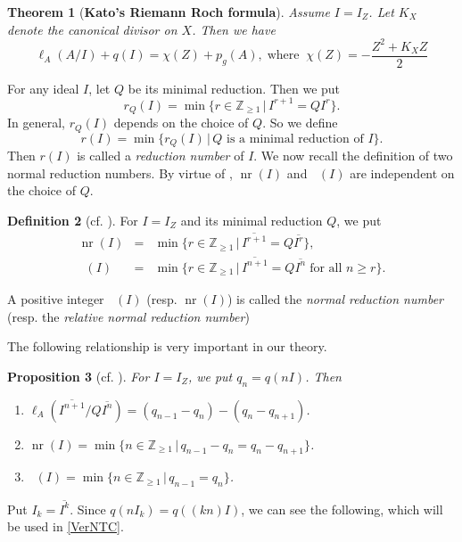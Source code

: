 \documentclass[12pt]{amsart}
\newtheorem{thm}{Theorem}[section]
\newtheorem{prop}[thm]{Proposition}
\theoremstyle{definition}
\newtheorem{defn}[thm]{Definition}
\theoremstyle{remark}
\numberwithin{equation}{section}
\DeclareMathOperator{\nr}{nr}
\DeclareMathOperator{\br}{\bar r}
\newcommand{\Z}{\mathbb Z}
\newcommand{\bbZ}{\ensuremath{\mathbb Z}}
\renewcommand{\:}{\colon}
\begin{document}
\begin{thm}[\textbf{Kato's Riemann Roch formula}] \label{RRformula}
Assume $I=I_Z$. Let $K_X$ denote the canonical divisor on $X$. 
Then we have 
\[
\ell_A(A/I)+q(I)=\chi(Z)+p_g(A), \;\text{where}\;\; \chi(Z)=-\dfrac{Z^2+K_XZ}{2}
\]
\end{thm}


\par \vspace{2mm}
For any ideal $I$, let $Q$ be its minimal reduction. 
Then we put 
\[
r_Q(I)=\min\{r \in \Z_{\ge 1}\,|\, I^{r+1}=QI^r\}. 
\]
In general, $r_Q(I)$ depends on the choice of $Q$. So
we define 
\[
r(I)=\min\{r_Q(I) \,|\, \text{$Q$ is a minimal reduction of $I$}\}. 
\]
Then $r(I)$ is called a \textit{reduction number} of $I$.  
We now recall the definition of two normal reduction numbers. 
By virtue of \cite[Lemma 4.1]{Hun}, $\nr(I)$ and $\br(I)$ are independent on the choice of $Q$. 

\begin{defn}[\textrm{cf. \cite[Definition 2.5]{OWY4}}] 
\label{NorRedNum}
For $I=I_Z$ and its minimal reduction $Q$, 
we put
\begin{eqnarray*}
\nr(I)&=& \min\{r \in \mathbb{Z}_{\ge 1}  \,| \,  \overline{I^{r+1}}=Q\overline{I^r} \}, \\[1mm]
\br(I) &=& \min\{r \in \mathbb{Z}_{\ge 1}  \,| \,  \overline{I^{n+1}}=Q\overline{I^n} \; \text{for all $n \ge r$}\}. 
\end{eqnarray*}
\par 
A positive integer $\br(I)$ (resp. $\nr(I)$) is called 
the {\it normal reduction number} 
(resp. the {\it relative normal reduction number}) 
\end{defn}



\par \vspace{2mm}
The following relationship is very important in our theory. 
\begin{prop}[\textrm{cf. \cite[Proposition 2.2]{OWY5}}] \label{q(nI)formula}
For $I=I_Z$, we put $q_{n}=q(nI)$. Then 
\begin{enumerate}
\item $\ell_A(\overline{I^{n+1}}/Q\overline{I^n})
=(q_{n-1}-q_n)-(q_n-q_{n+1})$. 
\item $\nr(I)= \min\{n \in \bbZ_{\ge 1} \,| \, 
q_{n-1}-q_n = q_n-q_{n+1} \}$. 
\item $\br(I)=\min\{n \in \bbZ_{\ge 1} \,|\, q_{n-1}=q_n  \}$. 
\end{enumerate}
\end{prop}
\par \vspace{2mm}
Put $I_k = \overline{I^k}$. Since $q (n I_k) = q((kn) I)$, we can see the following, 
which will be used in \ref{VerNTC}.
\end{document}
